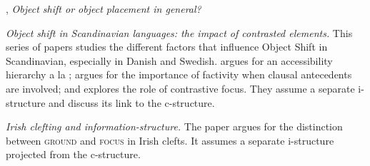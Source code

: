 \documentclass[output=paper,hidelinks]{langscibook}
\begin{document}
\citet{A10}, \textit{Object shift or object placement in general?}

\citet{A13} \textit{Object shift in Scandinavian languages: the impact of contrasted elements.} This series of papers studies the different factors that influence Object Shift in Scandinavian, especially in Danish and Swedish. \citet{A08} argues for an accessibility hierarchy a la \citet{GHZ93}; \citet{A09} argues for the importance of factivity when clausal antecedents are involved; and  \citet{A13} explores the role of contrastive focus. They assume a separate i-structure and discuss its link to the c-structure. 

\vspace{+6pt} 
\citet{Sulger09} \textit{Irish clefting and information-structure.} The paper argues for the distinction between \textsc{ground} and \textsc{focus} in Irish clefts. It assumes a separate i-structure projected from the c-structure.

 
\end{document}
